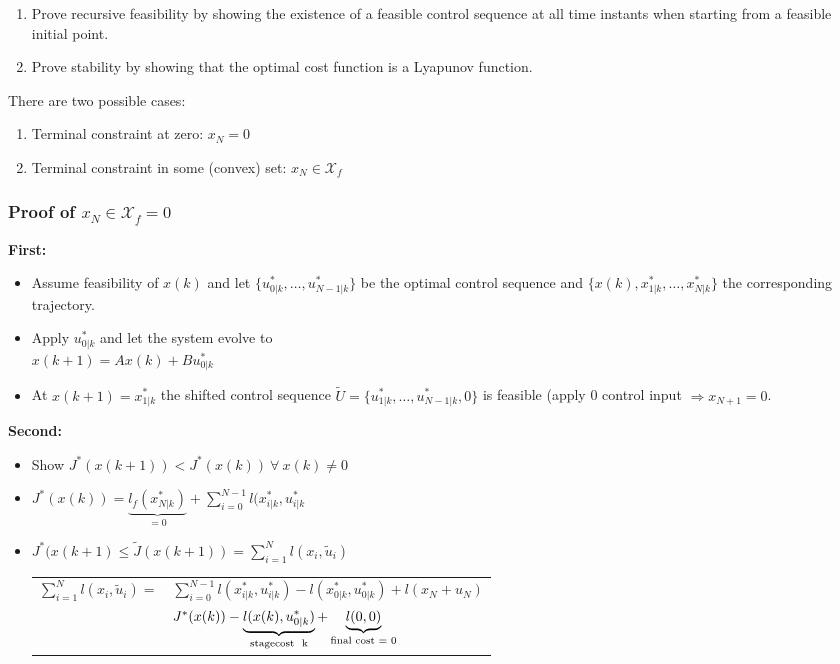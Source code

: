 \documentclass[8pt,a4paper]{scrartcl}
\begin{document}
\begin{multicols*}{3}
\begin{enumerate}
\ncompaq
\item Prove recursive feasibility by showing the existence of a feasible control sequence at all time instants when starting from a feasible initial point.
\item Prove stability by showing that the optimal cost function is a Lyapunov function.
\end{enumerate}

There are two possible cases:
\begin{enumerate}
\ncompaq
\item Terminal constraint at zero: $x_N=0$
\item Terminal constraint in some (convex) set: $x_N\in\mathcal{X}_f$
\end{enumerate}

\subsubsection{Proof of $x_N\in\mathcal{X}_f=0$}

\textbf{First:}
\begin{itemize}
\ncompaq
\item Assume feasibility of $x(k)$ and let $\{u_{0|k}^\ast,\ldots,u_{N-1|k}^\ast\}$ be the optimal control sequence and $\{x(k),x_{1|k}^\ast,\ldots,x_{N|k}^\ast\}$ the corresponding trajectory.
\item Apply $u_{0|k}^\ast$ and let the system evolve to\\$x(k+1)=Ax(k)+Bu_{0|k}^\ast$
\item At $x(k+1)=x_{1|k}^\ast$ the shifted control sequence \mbox{$\tilde{U}=\{u_{1|k}^\ast,\ldots,u_{N-1|k}^\ast, 0\}$} is feasible (apply 0 control input $\Rightarrow x_{N+1}=0$.
\end{itemize}

\textbf{Second:}
\begin{itemize}[leftmargin=*]
\ncompaq
\item Show $J^\ast(x(k+1))<J^\ast(x(k))\ \forall\ x(k)\neq 0$
\item $J^\ast(x(k))=\underbrace{l_f(x_{N|k}^\ast)}_{=0}+\sum\limits_{i=0}^{N-1}l(x_{i|k}^\ast,u_{i|k}^\ast$\\
\item $J^\ast(x(k+1)\leq \tilde{J}(x(k+1))=\sum\limits_{i=1}^Nl(x_i,\tilde{u}_i)$

\begin{tabular}{rl}
\small
$\sum\limits_{i=1}^Nl(x_i,\tilde{u}_i)=$&$\sum\limits_{i=0}^{N-1}l(x_{i|k}^\ast,u_{i|k}^\ast)-l(x_{0|k}^\ast,u_{0|k}^\ast)+l(x_N+u_N)$\normalsize\\
&$J^\ast(x(k))-\underbrace{l(x(k),u_{0|k}^\ast)}_{\text{stagecost \@ k}}+\underbrace{l(0,0)}_{\text{final cost = 0}}$
\end{tabular}
\end{itemize}


\end{multicols*}
\end{document}
